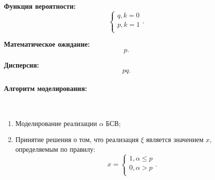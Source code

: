 \textbf{Функция вероятности:}
\begin{equation}
	\begin{cases}{}
		q, k = 0 \\
		p, k = 1 \\
	\end{cases}.
\end{equation}

\textbf{Математическое ожидание:}
\begin{equation}
	p.
\end{equation}

\textbf{Дисперсия:}
\begin{equation}
	pq.
\end{equation}

\paragraph{Алгоритм моделирования:}\
\

\begin{enumerate}
	\item Моделирование реализации $\alpha$ БСВ;
	\item Принятие решения о том, что реализация $\xi$ является значением $x$, определяемым по правилу:
	      \begin{equation}
		      x =
		      \begin{cases}{}
			      1, \alpha \leqslant p \\
			      0, \alpha > p         \\
		      \end{cases}.
	      \end{equation}
\end{enumerate}

